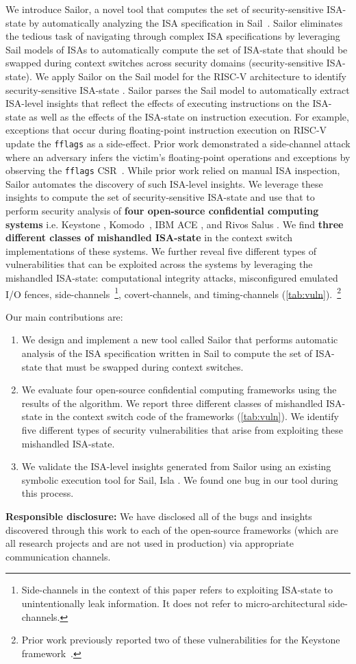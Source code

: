 We introduce Sailor, a novel tool that computes the set of security-sensitive ISA-state by automatically analyzing the ISA specification in Sail~\cite{sail}.
Sailor eliminates the tedious task of navigating through complex ISA specifications by leveraging Sail models of ISAs
to automatically compute the set of ISA-state that should be swapped during context switches across security domains (security-sensitive ISA-state). 
We apply Sailor on the Sail model for the RISC-V architecture to identify security-sensitive ISA-state \cite{sail-riscv}. 
Sailor parses the Sail model to automatically extract ISA-level insights that reflect the effects of executing instructions on the ISA-state as well as the effects of the ISA-state on instruction execution. 
For example, exceptions that occur during floating-point instruction execution on RISC-V update the \texttt{fflags} as a side-effect. 
Prior work demonstrated a side-channel attack where an adversary infers the victim's floating-point operations and exceptions by observing the \texttt{fflags} CSR~\cite{dtrap-fpu}. 
While prior work relied on manual ISA inspection, Sailor automates the discovery of such ISA-level insights.
We leverage these insights to compute the set of security-sensitive ISA-state and use that to perform security analysis of \textbf{four open-source confidential computing systems} i.e. Keystone \cite{keystone}, Komodo~\cite{komodo}, IBM ACE \cite{ibm-ace}, and Rivos Salus \cite{rivos-salus}. 
We find \textbf{three different classes of mishandled ISA-state} in the context switch implementations
of these systems.
We further reveal five different types of vulnerabilities that can be exploited across the systems by leveraging the mishandled ISA-state: computational integrity attacks, misconfigured emulated I/O fences, side-channels~\footnote{Side-channels in the context of this paper refers to exploiting ISA-state to unintentionally leak information. It does not refer to micro-architectural side-channels.}, covert-channels, and timing-channels (\autoref{tab:vuln}).~\footnote{Prior work previously reported two of these vulnerabilities for the Keystone framework~\cite{dtrap-fpu}.}

Our main contributions are: 
\begin{enumerate}
    \item We design and implement a new tool called Sailor that performs automatic analysis of the ISA specification written in Sail to compute the set of ISA-state that must be swapped during context switches.
    \item We evaluate four open-source confidential computing frameworks using the results of the algorithm. We report three different classes of mishandled ISA-state %
    in the context switch code of the frameworks (\autoref{tab:vuln}). We identify five different types of security vulnerabilities that arise from exploiting these mishandled ISA-state.  
    \item We validate the ISA-level insights generated from Sailor using an existing symbolic execution tool for Sail, Isla \cite{isla}. We found one bug in our tool during this process. 
\end{enumerate}

\textbf{Responsible disclosure:}  
We have disclosed all of the bugs and insights discovered through this work to each of the open-source frameworks (which are all research projects and are not used in production) via appropriate communication channels. 

